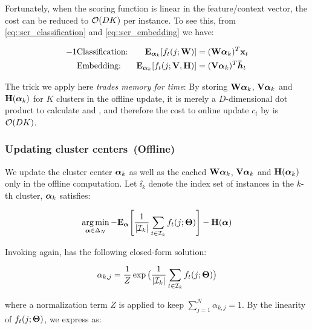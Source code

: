 Fortunately, when the scoring function is linear in the feature/context vector,
the cost can be reduced to $\mathcal{O}(DK)$ per instance. To see this, from
\eqref{eq::scr_classification} and \eqref{eq::scr_embedding} we have:

\begin{alignat}{-1}
  &\cc &
  \E_{\valpha_{k}}[f_t(j; \vW)] &= (\vW \valpha_{k})^T \vx_t
  \label{eq::exp_classification}\\
  &\ee &
  \E_{\valpha_{k}}[f_t(j; \vV,\vH)] &= (\vV \valpha_{k})^T \vhb_t
  \label{eq::exp_embedding}
\end{alignat}

The trick we apply here \emph{trades memory for time}: By storing $\mathbf{W}
\boldsymbol{\alpha}_{k}$, $\mathbf{V} \boldsymbol{\alpha}_{k}$ and $\mathbf{H}(\boldsymbol{\alpha}_k)$ for $K$ clusters in
the offline update, it is merely a $D$-dimensional dot product to calculate
 and , and therefore the
cost to online update $c_t$ by  is $\mathcal{O}(DK)$.

\subsubsection{Updating cluster centers~(Offline)}

We update the cluster center $\boldsymbol{\alpha}_k$ as well as the cached $\mathbf{W}
\boldsymbol{\alpha}_{k}$, $\mathbf{V} \boldsymbol{\alpha}_{k}$ and $\mathbf{H}(\boldsymbol{\alpha}_k)$ only in the offline
computation. Let $\ii_k$ denote the index set of instances in the $k$-th
cluster, $\boldsymbol{\alpha}_k$ satisfies:

\begin{align}
   \operatorname*{arg\,min}\limits_{\boldsymbol{\alpha} \in \Delta_N}
   -\mathbf{E}_{\boldsymbol{\alpha}}\Bigg[\frac{1}{|\mathcal{I}_k|}
                      \sum\limits_{t \in \mathcal{I}_k}f_t(j; \mathbf{\Theta})\Bigg]
   -\mathbf{H}(\boldsymbol{\alpha}) \label{eq::up_clu_center_opt}
\end{align}

Invoking  again,  has the
following closed-form solution:

\begin{align}
  \alpha_{k, j} = \frac{1}{Z} \exp\big(
      \frac{1}{| \mathcal{I}_k |}
      \sum\limits_{t \in \mathcal{I}_k} f_t(j;\mathbf{\Theta}) \big)
  \label{eq::up_clu_center}
\end{align}

where a normalization term $Z$ is applied to keep $\sum\limits_{j=1}^N
\alpha_{k,j} = 1$. By the linearity of $f_t(j;\mathbf{\Theta})$, we express
 as:

